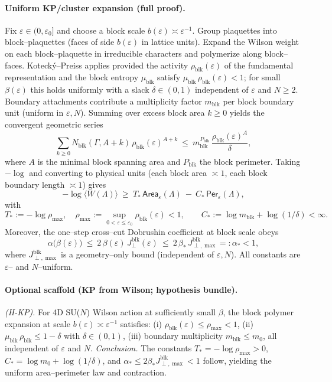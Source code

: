 \documentclass[11pt]{amsart}
\begin{document}
\paragraph{Uniform KP/cluster expansion (full proof).}
Fix $\varepsilon\in(0,\varepsilon_0]$ and choose a block scale $b(\varepsilon)\asymp \varepsilon^{-1}$. Group plaquettes into block–plaquettes (faces of side $b(\varepsilon)$ in lattice units). Expand the Wilson weight on each block–plaquette in irreducible characters and polymerize along block–faces. Koteck\'y–Preiss applies provided the activity $\rho_{\mathrm{blk}}(\varepsilon)$ of the fundamental representation and the block entropy $\mu_{\mathrm{blk}}$ satisfy $\mu_{\mathrm{blk}}\,\rho_{\mathrm{blk}}(\varepsilon) < 1$; for small $\beta(\varepsilon)$ this holds uniformly with a slack $\delta\in(0,1)$ independent of $\varepsilon$ and $N\ge2$. Boundary attachments contribute a multiplicity factor $m_{\mathrm{blk}}$ per block boundary unit (uniform in $\varepsilon,N$). Summing over excess block area $k\ge0$ yields the convergent geometric series
\[
  \sum_{k\ge 0} N_{\mathrm{blk}}(\Gamma,A+k)\,\rho_{\mathrm{blk}}(\varepsilon)^{A+k}
   \ \le\ m_{\mathrm{blk}}^{P_{\mathrm{blk}}}\,\frac{\rho_{\mathrm{blk}}(\varepsilon)^{A}}{\delta},
\]
where $A$ is the minimal block spanning area and $P_{\mathrm{blk}}$ the block perimeter. Taking $-\log$ and converting to physical units (each block area $\asymp 1$, each block boundary length $\asymp 1$) gives
\[
  -\log\langle W(\Lambda)\rangle\ \ge\ T_*\,\mathsf{Area}_\varepsilon(\Lambda)\ -\ C_*\,\mathsf{Per}_\varepsilon(\Lambda),
\]
with
\[
  T_*:= -\log \rho_{\max},\quad \rho_{\max}:=\sup_{0<\varepsilon\le\varepsilon_0}\rho_{\mathrm{blk}}(\varepsilon)<1,\qquad
  C_*:= \log m_{\mathrm{blk}}+\log(1/\delta)<\infty.
\]
Moreover, the one–step cross–cut Dobrushin coefficient at block scale obeys
\[
  \alpha\bigl(\beta(\varepsilon)\bigr)\ \le\ 2\,\beta(\varepsilon)\,J^{\mathrm{blk}}_{\perp}(\varepsilon)
   \ \le\ 2\,\beta_*\,J^{\mathrm{blk}}_{\perp,\max}=:\alpha_*<1,
\]
where $J^{\mathrm{blk}}_{\perp,\max}$ is a geometry–only bound (independent of $\varepsilon,N$). All constants are $\varepsilon$– and $N$–uniform.

\paragraph{Optional scaffold (KP from Wilson; hypothesis bundle).}
\emph{(H-KP).} For 4D SU($N$) Wilson action at sufficiently small $\beta$, the block polymer expansion at scale $b(\varepsilon)\asymp \varepsilon^{-1}$ satisfies: (i) $\rho_{\mathrm{blk}}(\varepsilon)\le \rho_{\max}<1$, (ii) $\mu_{\mathrm{blk}}\,\rho_{\mathrm{blk}}\le 1-\delta$ with $\delta\in(0,1)$, (iii) boundary multiplicity $m_{\mathrm{blk}}\le m_0$, all independent of $\varepsilon$ and $N$. \emph{Conclusion.} The constants $T_*=-\log\rho_{\max}>0$, $C_* = \log m_0 + \log(1/\delta)$, and $\alpha_*\le 2\beta_* J^{\mathrm{blk}}_{\perp,\max}<1$ follow, yielding the uniform area–perimeter law and contraction.
\end{document}
